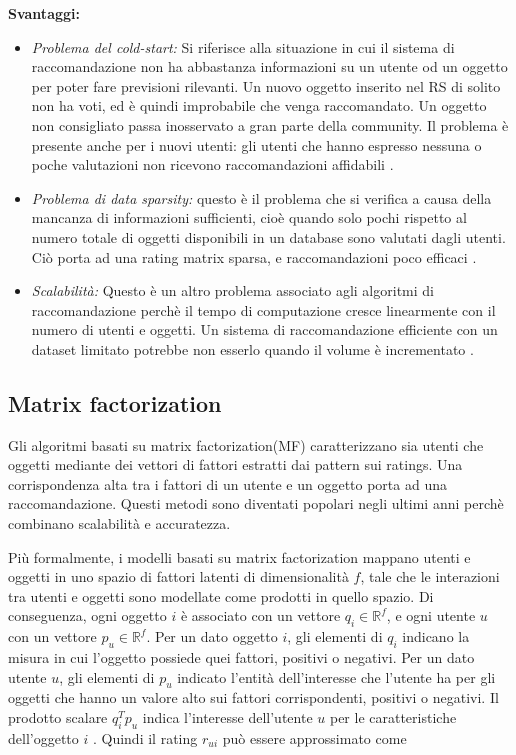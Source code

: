 \documentclass[12pt,italian]{report}
\begin{document}
\noindent \textbf{Svantaggi:}
\begin{itemize}
 \item \textit{Problema del cold-start:} Si riferisce alla situazione in cui il sistema di raccomandazione non ha abbastanza informazioni su un utente od un oggetto per poter fare previsioni rilevanti. Un nuovo oggetto inserito nel RS di solito non ha voti, ed è quindi improbabile che venga raccomandato. Un oggetto non consigliato passa inosservato a gran parte della community. Il problema è presente anche per i nuovi utenti: gli utenti che hanno espresso nessuna o poche valutazioni non ricevono raccomandazioni affidabili \cite{cold-start}.   
 
 \item  \textit{Problema di data sparsity:} questo è il problema che si verifica a causa della mancanza di informazioni sufficienti, cioè quando solo pochi rispetto al numero totale di oggetti disponibili in un database sono valutati dagli utenti. Ciò porta ad una rating matrix sparsa, e raccomandazioni poco efficaci \cite{recsys-principle-methods-evaluation}.
 
 \item \textit{Scalabilità:} Questo è un altro problema associato agli algoritmi di raccomandazione perchè il tempo di computazione cresce linearmente con il numero di utenti e oggetti. Un sistema di raccomandazione efficiente con un dataset limitato potrebbe non esserlo quando il volume è incrementato \cite{recsys-principle-methods-evaluation}.
\end{itemize}

\subsection{Matrix factorization} \label{ssec:mf}
Gli algoritmi basati su matrix factorization(MF) caratterizzano sia utenti che oggetti mediante dei vettori di fattori estratti dai pattern sui ratings. Una corrispondenza alta tra i fattori di un utente e un oggetto porta ad una raccomandazione. Questi metodi sono diventati popolari negli ultimi anni perchè combinano scalabilità e accuratezza.

Più formalmente, i modelli basati su matrix factorization mappano utenti e oggetti in uno spazio di fattori latenti di dimensionalità $f$, tale che le interazioni tra utenti e oggetti sono modellate come prodotti in quello spazio. Di conseguenza, ogni oggetto $i$ è associato con un vettore $q_i \in \mathbb{R}^f$, e ogni utente $u$ con un vettore $p_u \in \mathbb{R}^f$. Per un dato oggetto $i$, gli elementi di $q_i$ indicano la misura in cui l'oggetto possiede quei fattori, positivi o negativi. Per un dato utente $u$, gli elementi di $p_u$ indicato l'entità dell'interesse che l'utente ha per gli oggetti che hanno un valore alto sui fattori corrispondenti, positivi o negativi. Il prodotto scalare $q_i^Tp_u$ indica l'interesse dell'utente $u$ per le caratteristiche dell'oggetto $i$ \cite{matrix-factorization}. Quindi il rating $r_{ui}$ può essere approssimato come
\end{document}
